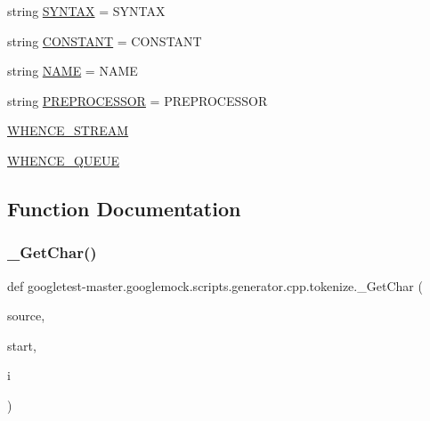 \begin{DoxyCompactItemize}
\item 
string \mbox{\hyperlink{namespacegoogletest-master_1_1googlemock_1_1scripts_1_1generator_1_1cpp_1_1tokenize_a81e0b12fd2645acf961e2e007c3f3330}{S\+Y\+N\+T\+AX}} = \textquotesingle{}S\+Y\+N\+T\+AX\textquotesingle{}
\item 
string \mbox{\hyperlink{namespacegoogletest-master_1_1googlemock_1_1scripts_1_1generator_1_1cpp_1_1tokenize_aa7c7fcc4418ba66bfa95cd4547f527f4}{C\+O\+N\+S\+T\+A\+NT}} = \textquotesingle{}C\+O\+N\+S\+T\+A\+NT\textquotesingle{}
\item 
string \mbox{\hyperlink{namespacegoogletest-master_1_1googlemock_1_1scripts_1_1generator_1_1cpp_1_1tokenize_a4a834eb514e1aa082fe4e8cbe728006c}{N\+A\+ME}} = \textquotesingle{}N\+A\+ME\textquotesingle{}
\item 
string \mbox{\hyperlink{namespacegoogletest-master_1_1googlemock_1_1scripts_1_1generator_1_1cpp_1_1tokenize_a0d7b3e030824bf2a9d8f43e4d62e400d}{P\+R\+E\+P\+R\+O\+C\+E\+S\+S\+OR}} = \textquotesingle{}P\+R\+E\+P\+R\+O\+C\+E\+S\+S\+OR\textquotesingle{}
\item 
\mbox{\hyperlink{namespacegoogletest-master_1_1googlemock_1_1scripts_1_1generator_1_1cpp_1_1tokenize_a8adeb14ae627036f5fa4fa611e56342a}{W\+H\+E\+N\+C\+E\+\_\+\+S\+T\+R\+E\+AM}}
\item 
\mbox{\hyperlink{namespacegoogletest-master_1_1googlemock_1_1scripts_1_1generator_1_1cpp_1_1tokenize_a6988dccaed652b3c9fa5d4716dde1dc9}{W\+H\+E\+N\+C\+E\+\_\+\+Q\+U\+E\+UE}}
\end{DoxyCompactItemize}


\subsection{Function Documentation}
\mbox{\label{namespacegoogletest-master_1_1googlemock_1_1scripts_1_1generator_1_1cpp_1_1tokenize_a7f0c078163faac84d75890ac4cca3517}} 
\subsubsection{\texorpdfstring{\_GetChar()}{\_GetChar()}}
{\footnotesize\ttfamily def googletest-\/master.\+googlemock.\+scripts.\+generator.\+cpp.\+tokenize.\+\_\+\+Get\+Char (\begin{DoxyParamCaption}\item[{}]{source,  }\item[{}]{start,  }\item[{}]{i }\end{DoxyParamCaption})\hspace{0.3cm}{\ttfamily [private]}}

